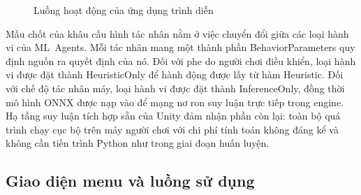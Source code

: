 \begin{figure}[H]
{%
    }

    \caption{Luồng hoạt động của ứng dụng trình diễn}
    \label{fig:app_flow}
\end{figure}
\indent Mấu chốt của khâu cấu hình tác nhân nằm ở việc chuyển đổi giữa các loại hành vi
của ML~Agents. Mỗi tác nhân mang một thành phần BehaviorParameters quy định nguồn
ra quyết định của nó. Đối với phe do người chơi điều khiển, loại hành vi được đặt thành
HeuristicOnly để hành động được lấy từ hàm Heuristic. Đối với chế độ tác
nhân máy, loại hành vi được đặt thành InferenceOnly, đồng thời mô hình ONNX được
nạp vào để mạng nơ ron suy luận trực tiếp trong engine. Hạ tầng suy luận tích hợp sẵn của
Unity đảm nhận phần còn lại: toàn bộ quá trình chạy cục bộ trên máy người chơi với chi phí
tính toán không đáng kể và không cần tiến trình Python như trong giai đoạn huấn luyện.

\subsection{Giao diện menu và luồng sử dụng}
\label{sub:app-menu}

